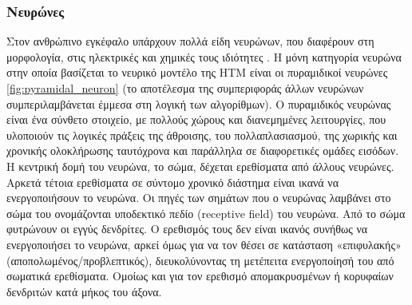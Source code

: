 	\subsubsection{Νευρώνες}

	Στον ανθρώπινο εγκέφαλο υπάρχουν πολλά είδη νευρώνων, που διαφέρουν στη μορφολογία, στις ηλεκτρικές και χημικές τους ιδιότητες \parencite{markramReconstructionSimulationNeocortical2015}.
	Η μόνη κατηγορία νευρώνα στην οποία βασίζεται το νευρικό μοντέλο της HTM είναι οι πυραμιδικοί νευρώνες \ref{fig:pyramidal_neuron}
	(το αποτέλεσμα της συμπεριφοράς άλλων νευρώνων συμπεριλαμβάνεται έμμεσα στη λογική των αλγορίθμων).
	Ο πυραμιδικός νευρώνας είναι ένα σύνθετο στοιχείο, με πολλούς χώρους και διανεμημένες λειτουργίες, που υλοποιούν τις λογικές πράξεις της άθροισης,
	του πολλαπλασιασμού, της χωρικής και χρονικής ολοκλήρωσης ταυτόχρονα και παράλληλα σε διαφορετικές ομάδες εισόδων.
	Η κεντρική δομή του νευρώνα, το σώμα, δέχεται ερεθίσματα από άλλους νευρώνες.
	Αρκετά τέτοια ερεθίσματα σε σύντομο χρονικό διάστημα είναι ικανά να ενεργοποιήσουν το νευρώνα.
	Οι πηγές των σημάτων που ο νευρώνας λαμβάνει στο σώμα του ονομάζονται υποδεκτικό πεδίο (receptive field) του νευρώνα.
	Από το σώμα φυτρώνουν οι εγγύς δενδρίτες. Ο ερεθισμός τους δεν είναι ικανός συνήθως να ενεργοποιήσει το νευρώνα, αρκεί όμως για να τον θέσει
	σε κατάσταση «επιφυλακής» (αποπολωμένος/προβλεπτικός), διευκολύνοντας τη μετέπειτα ενεργοποίησή του από σωματικά ερεθίσματα.
	Ομοίως και για τον ερεθισμό απομακρυσμένων ή κορυφαίων δενδριτών κατά μήκος του άξονα.

